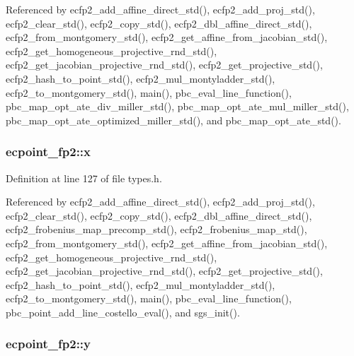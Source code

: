 Referenced by ecfp2\-\_\-add\-\_\-affine\-\_\-direct\-\_\-std(), ecfp2\-\_\-add\-\_\-proj\-\_\-std(), ecfp2\-\_\-clear\-\_\-std(), ecfp2\-\_\-copy\-\_\-std(), ecfp2\-\_\-dbl\-\_\-affine\-\_\-direct\-\_\-std(), ecfp2\-\_\-from\-\_\-montgomery\-\_\-std(), ecfp2\-\_\-get\-\_\-affine\-\_\-from\-\_\-jacobian\-\_\-std(), ecfp2\-\_\-get\-\_\-homogeneous\-\_\-projective\-\_\-rnd\-\_\-std(), ecfp2\-\_\-get\-\_\-jacobian\-\_\-projective\-\_\-rnd\-\_\-std(), ecfp2\-\_\-get\-\_\-projective\-\_\-std(), ecfp2\-\_\-hash\-\_\-to\-\_\-point\-\_\-std(), ecfp2\-\_\-mul\-\_\-montyladder\-\_\-std(), ecfp2\-\_\-to\-\_\-montgomery\-\_\-std(), main(), pbc\-\_\-eval\-\_\-line\-\_\-function(), pbc\-\_\-map\-\_\-opt\-\_\-ate\-\_\-div\-\_\-miller\-\_\-std(), pbc\-\_\-map\-\_\-opt\-\_\-ate\-\_\-mul\-\_\-miller\-\_\-std(), pbc\-\_\-map\-\_\-opt\-\_\-ate\-\_\-optimized\-\_\-miller\-\_\-std(), and pbc\-\_\-map\-\_\-opt\-\_\-ate\-\_\-std().

\hypertarget{structecpoint__fp2_aa6108d5dc8f23602e749baa8c6869bf7}{
\subsubsection[{x}]{ ecpoint\-\_\-fp2\-::x}}\label{structecpoint__fp2_aa6108d5dc8f23602e749baa8c6869bf7}


Definition at line 127 of file types.\-h.



Referenced by ecfp2\-\_\-add\-\_\-affine\-\_\-direct\-\_\-std(), ecfp2\-\_\-add\-\_\-proj\-\_\-std(), ecfp2\-\_\-clear\-\_\-std(), ecfp2\-\_\-copy\-\_\-std(), ecfp2\-\_\-dbl\-\_\-affine\-\_\-direct\-\_\-std(), ecfp2\-\_\-frobenius\-\_\-map\-\_\-precomp\-\_\-std(), ecfp2\-\_\-frobenius\-\_\-map\-\_\-std(), ecfp2\-\_\-from\-\_\-montgomery\-\_\-std(), ecfp2\-\_\-get\-\_\-affine\-\_\-from\-\_\-jacobian\-\_\-std(), ecfp2\-\_\-get\-\_\-homogeneous\-\_\-projective\-\_\-rnd\-\_\-std(), ecfp2\-\_\-get\-\_\-jacobian\-\_\-projective\-\_\-rnd\-\_\-std(), ecfp2\-\_\-get\-\_\-projective\-\_\-std(), ecfp2\-\_\-hash\-\_\-to\-\_\-point\-\_\-std(), ecfp2\-\_\-mul\-\_\-montyladder\-\_\-std(), ecfp2\-\_\-to\-\_\-montgomery\-\_\-std(), main(), pbc\-\_\-eval\-\_\-line\-\_\-function(), pbc\-\_\-point\-\_\-add\-\_\-line\-\_\-costello\-\_\-eval(), and sgs\-\_\-init().

\hypertarget{structecpoint__fp2_abde52907800a97b34eb4cd2cae674640}{
\subsubsection[{y}]{ ecpoint\-\_\-fp2\-::y}}\label{structecpoint__fp2_abde52907800a97b34eb4cd2cae674640}


